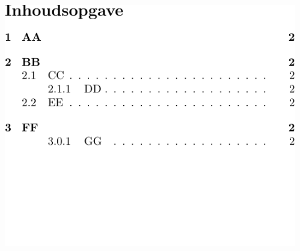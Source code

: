 \begin{frame}[fragile]
\begin{columns}
\begin{column}{0.5\textwidth}
\begin{codebox}
\begin{verbatim}
            \end{verbatim}
            \end{codebox}
        \end{column}
        \begin{column}{0.5\textwidth}
            \includegraphics[width=\linewidth,height=0.8\textheight,keepaspectratio,page=1]{assets/tableofcontentsdutch.pdf}
            \vspace{-60pt}
        \end{column}
    \end{columns}
\end{frame}

\endDetail

